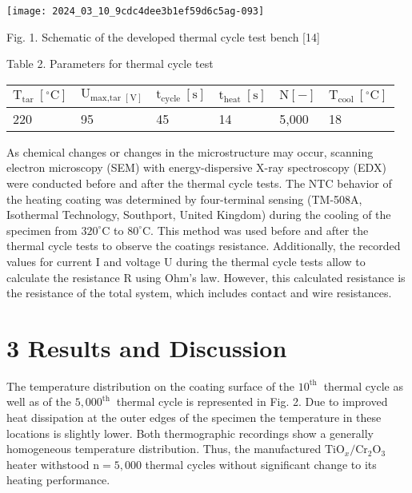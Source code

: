 \documentclass[10pt]{article}
\begin{document}
\begin{center}
\texttt{[image: 2024\_03\_10\_9cdc4dee3b1ef59d6c5ag-093]}
\end{center}

Fig. 1. Schematic of the developed thermal cycle test bench [14]

Table 2. Parameters for thermal cycle test

\begin{center}
\begin{tabular}{l|l|l|l|l|l}
\hline
$\mathrm{T}_{\text {tar }}\left[{ }^{\circ} \mathrm{C}\right]$ & $\mathrm{U}_{\text {max,tar }[\mathrm{V}]}$ & $\mathrm{t}_{\text {cycle }}[\mathrm{s}]$ & $\mathrm{t}_{\text {heat }}[\mathrm{s}]$ & $\mathrm{N}[-]$ & $\mathrm{T}_{\text {cool }}\left[{ }^{\circ} \mathrm{C}\right]$ \\
\hline
220 & 95 & 45 & 14 & 5,000 & 18 \\
\hline
\end{tabular}
\end{center}

As chemical changes or changes in the microstructure may occur, scanning electron microscopy (SEM) with energy-dispersive X-ray spectroscopy (EDX) were conducted before and after the thermal cycle tests. The NTC behavior of the heating coating was determined by four-terminal sensing (TM-508A, Isothermal Technology, Southport, United Kingdom) during the cooling of the specimen from $320^{\circ} \mathrm{C}$ to $80^{\circ} \mathrm{C}$. This method was used before and after the thermal cycle tests to observe the coatings resistance. Additionally, the recorded values for current I and voltage U during the thermal cycle tests allow to calculate the resistance R using Ohm's law. However, this calculated resistance is the resistance of the total system, which includes contact and wire resistances.

\section*{3 Results and Discussion}
The temperature distribution on the coating surface of the $10^{\text {th }}$ thermal cycle as well as of the $5,000^{\text {th }}$ thermal cycle is represented in Fig. 2. Due to improved heat dissipation at the outer edges of the specimen the temperature in these locations is slightly lower. Both thermographic recordings show a generally homogeneous temperature distribution. Thus, the manufactured $\mathrm{TiO}_{x} / \mathrm{Cr}_{2} \mathrm{O}_{3}$ heater withstood $\mathrm{n}=5,000$ thermal cycles without significant change to its heating performance.
\end{document}
